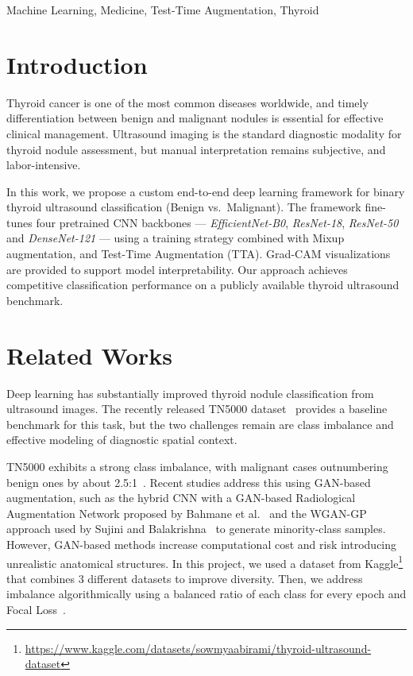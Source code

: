 \documentclass[conference]{IEEEtran}
\begin{document}
\begin{IEEEkeywords}
Machine Learning, Medicine, Test-Time Augmentation, Thyroid
\end{IEEEkeywords}


\section{Introduction}

\medskip
Thyroid cancer is one of the most common diseases worldwide, and timely
differentiation between benign and malignant nodules is essential for effective clinical
management. Ultrasound imaging is the standard diagnostic modality for thyroid nodule
assessment, but manual interpretation remains subjective, and
labor-intensive.

In this work, we propose a custom end-to-end deep learning framework for binary thyroid
ultrasound classification (Benign vs.\ Malignant). The framework fine-tunes four pretrained
CNN backbones --- \textit{EfficientNet-B0}, \textit{ResNet-18}, \textit{ResNet-50} and
\textit{DenseNet-121} --- using a training strategy combined with Mixup augmentation, and
Test-Time Augmentation (TTA). Grad-CAM visualizations are provided to support model
interpretability. Our approach achieves competitive classification performance on a publicly
available thyroid ultrasound benchmark.


\section{Related Works}

Deep learning has substantially improved thyroid nodule classification from ultrasound images.
The recently released TN5000 dataset~\cite{zhang2025tn5000} provides a baseline
benchmark for this task, but the two challenges remain are class imbalance and effective
modeling of diagnostic spatial context.

TN5000 exhibits a strong class imbalance, with malignant cases outnumbering benign ones by
about 2.5:1~\cite{zhang2025tn5000}. Recent studies address this using GAN-based augmentation,
such as the hybrid CNN with a GAN-based Radiological Augmentation Network proposed by Bahmane
et al.~\cite{bahmane2025hybrid} and the WGAN-GP approach used by Sujini and
Balakrishna~\cite{sujini2025automated} to generate minority-class samples. However, GAN-based
methods increase computational cost and risk introducing unrealistic anatomical structures. In
this project, we used a dataset from Kaggle\footnote{\url{https://www.kaggle.com/datasets/sowmyaabirami/thyroid-ultrasound-dataset}}
that combines 3 different datasets to improve diversity. Then, we address imbalance
algorithmically using a balanced ratio of each class for every epoch and Focal
Loss~\cite{Lin2017Focal}.
\end{document}
